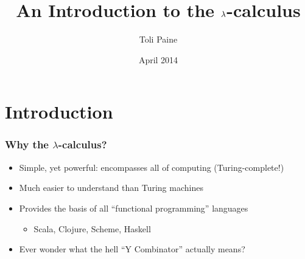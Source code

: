 \documentclass{beamer}
\title{An Introduction to the $\l$-calculus}
\author{Toli Paine}
\institute{Quantcast}
\date{April 2014}
\renewcommand{\l}{\lambda} %
\begin{document}
    \frame{\titlepage}

    \section{Introduction}
    \begin{frame}
        \frametitle{Why the $\l$-calculus?}
        \pause
        \begin{itemize}[<+->]
            \setlength{\itemsep}{1.5em}
            \item Simple, yet powerful: encompasses all of computing
                (Turing-complete!)
            \item Much easier to understand than Turing machines
            \item Provides the basis of all ``functional programming''
                languages \\[0.25em]
                \begin{itemize}[<+->]
                    \item Scala, Clojure, Scheme, Haskell
                \end{itemize}
                \vspace{-0.5em}
            \item Ever wonder what the hell ``Y Combinator'' actually means?
        \end{itemize}
    \end{frame}
\end{document}

